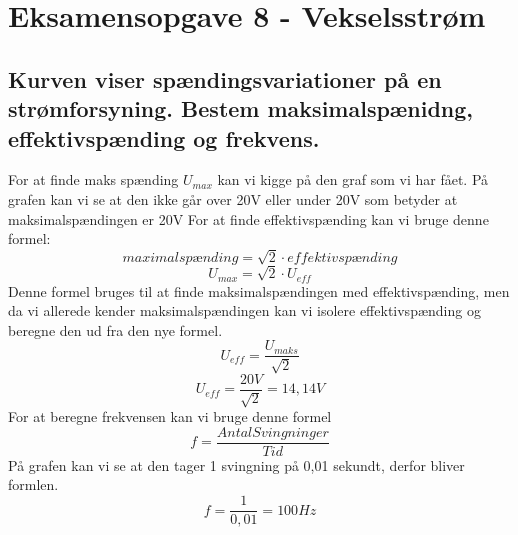 \section{Eksamensopgave 8 - Vekselsstrøm}
\subsection{Kurven viser spændingsvariationer på en strømforsyning. Bestem maksimalspænidng, effektivspænding og frekvens.}
For at finde maks spænding \begin{math}U_{max}\end{math} kan vi kigge på den graf som vi har fået. På grafen kan vi se at den ikke går over 20V eller under 20V som betyder at maksimalspændingen er 20V\newline
For at finde effektivspænding kan vi bruge denne formel:
\begin{equation*}
    maximalspænding = \sqrt{2}\cdot effektivspænding
\end{equation*}
\begin{equation*}
    U_{max} = \sqrt{2}\cdot U_{eff}
\end{equation*}
Denne formel bruges til at finde maksimalspændingen med effektivspænding, men da vi allerede kender maksimalspændingen kan vi isolere effektivspænding og beregne den ud fra den nye formel.
\begin{equation*}
    U_{eff}=\frac{U_{maks}}{\sqrt{2}}
\end{equation*}
\begin{equation*}
    U_{eff}=\frac{20V}{\sqrt{2}}=14,14V
\end{equation*}
For at beregne frekvensen kan vi bruge denne formel
\begin{equation*}
    f=\frac{Antal Svingninger}{Tid}
\end{equation*}
På grafen kan vi se at den tager 1 svingning på 0,01 sekundt, derfor bliver formlen.
\begin{equation*}
    f=\frac{1}{0,01}=100Hz
\end{equation*}

